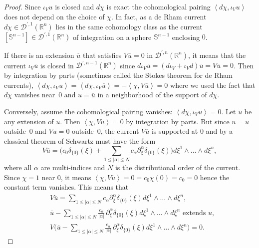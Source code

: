 \documentclass[JEP,XML,SOM,Unicode]{cedram}
\let\pazocal\mathscr
\theoremstyle{definition}
\newcommand\rr{{\mathbb R}}
\let\Feuler V
\let\exd u
\begin{document}
\begin{proof}
Since $\iota_\Feuler \exd$ is closed and $d\chi$ is exact the cohomological pairing
$\left\langle d\chi, \iota_\Feuler \exd \right\rangle
$ does not depend on the choice of $\chi$. In fact, as a de Rham current $d\chi\in \pazocal{D}^{\prime,1}(\rr^n)$ lies in the same cohomology class as the current $[\mathbb{S}^{n-1}]\in \pazocal{D}^{\prime,1}(\rr^n)$ of integration on a sphere $\mathbb{S}^{n-1}$ enclosing $0$.

If there is an extension $\overline{\exd}$ that satisfies $\Feuler \overline{\exd}=0$ in
$\pazocal{D}^{\prime,n}(\rr^n)$, it means that the current $\iota_\Feuler \overline{\exd}$ is closed in $\pazocal{D}^{\prime,n-1}(\rr^n) $
since $ d\iota_\Feuler \overline{\exd}=\left(d\iota_\Feuler+\iota_\Feuler d \right)\overline{\exd}=\Feuler \overline{\exd}=0 $.
Then by integration by parts (sometimes called the Stokes theorem for de Rham currents),
$\left\langle d\chi, \iota_\Feuler \exd \right\rangle=\left\langle d\chi, \iota_\Feuler \overline{\exd} \right\rangle=-\left\langle \chi, \Feuler \overline{\exd} \right\rangle= 0$
where we used the fact that $d\chi$ vanishes near~$0$ and $\exd=\overline{\exd}$ in a neighborhood of the support of $d\chi$.

Conversely, assume the cohomological pairing vanishes: $\left\langle d\chi, \iota_\Feuler \exd \right\rangle=0
$. Let $\overline{\exd}$ be any extension of $\exd$. Then $\left\langle \chi, \Feuler \overline{\exd} \right\rangle=0
$ by integration by parts. But since $\exd=\overline{\exd}$ outside~$0$ and $\Feuler \exd=0$ outside~$0$,
the current $\Feuler \overline{\exd}$ is supported at $0$ and by a classical theorem of Schwartz must have the form
\[
\Feuler \overline{\exd}=\biggl(c_0\delta_{\{0\}}(\xi) + \sum_{1\leqslant\vert \alpha \vert\leqslant N} c_\alpha\partial_\xi^\alpha\delta_{\{0\}}(\xi) \biggr) d\xi^1\wedge \dots\wedge d\xi^n,
\]
where all $\alpha$ are multi-indices and $N$ is the distributional
order of the current.
Since $\chi=1$ near $0$, it means
$\left\langle \chi, \Feuler \overline{\exd} \right\rangle=0
=c_0\chi(0)=c_0=0$ hence the constant term vanishes.
This means that
\begin{align*}
&\Feuler \overline{\exd}= \sum_{1\leqslant\vert \alpha \vert\leqslant N}c_\alpha\partial_\xi^\alpha\delta_{\{0\}}(\xi) d\xi^1\wedge \dots\wedge d\xi^n,\\
&\overline{\exd}- \sum_{1\leqslant\vert \alpha \vert\leqslant N}\frac{c_\alpha}{\vert\alpha\vert}\,\partial_\xi^\alpha\delta_{\{0\}}(\xi) d\xi^1\wedge \dots\wedge d\xi^n\text{ extends $\exd$},\\
\tag*{and}
&\Feuler\biggl(\overline{\exd}- \sum_{1\leqslant\vert \alpha \vert\leqslant N}\frac{c_\alpha}{\vert\alpha\vert}\,\partial_\xi^\alpha\delta_{\{0\}}(\xi) d\xi^1\wedge \dots\wedge d\xi^n \biggr)=0.
\end{align*}


\end{proof}
\end{document}
